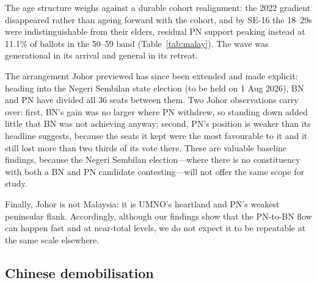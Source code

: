 \documentclass[11pt]{article}
\begin{document}
The age structure weighs against a durable cohort realignment: the 2022 gradient disappeared rather than ageing forward with the cohort, and by SE-16 the 18--29s were indistinguishable from their elders, residual PN support peaking instead at 11.1\% of ballots in the 50--59 band (Table~\ref{tab:malay}). The wave was generational in its arrival and general in its retreat.

The arrangement Johor previewed has since been extended and made explicit: heading into the Negeri Sembilan state election (to be held on 1 Aug 2026), BN and PN have divided all 36 seats between them. Two Johor observations carry over: first, BN's gain was no larger where PN withdrew, so standing down added little that BN was not achieving anyway; second, PN's position is weaker than its headline suggests, because the seats it kept were the most favourable to it and it still lost more than two thirds of its vote there. These are valuable baseline findings, because the Negeri Sembilan election---where there is no constituency with both a BN and PN candidate contesting---will not offer the same scope for study.

Finally, Johor is not Malaysia: it is UMNO's heartland and PN's weakest peninsular flank. Accordingly, although our findings show that the PN-to-BN flow can happen fast and at near-total levels, we do not expect it to be repeatable at the same scale elsewhere.

\subsection{Chinese demobilisation}
\label{sec:findings-chinese}
\end{document}
